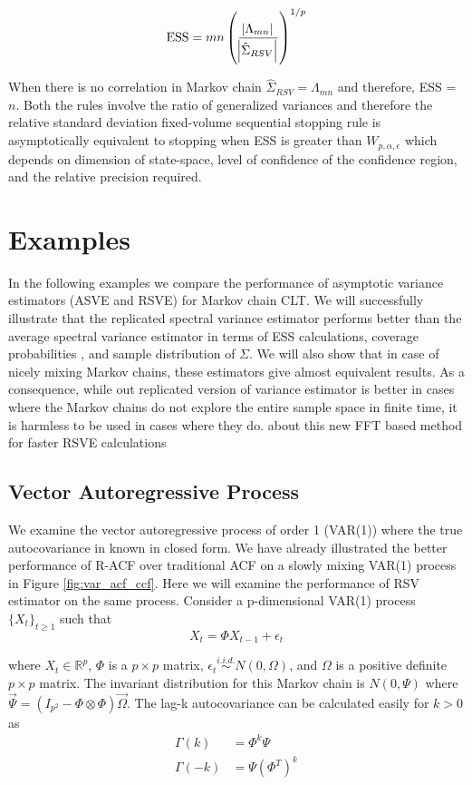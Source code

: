 \documentclass[12pt]{article}
\theoremstyle{remark}
\begin{document}
\[
\text{ESS} = mn\left(\dfrac{\abs{\Lambda_{mn}}}{\abs{\hat{\Sigma}_{RSV}}}\right)^{1/p}
\]

When there is no correlation in Markov chain $\hat{\Sigma}_{RSV} = \Lambda_{mn}$ and therefore, ESS = $n$. Both the rules involve the ratio of generalized variances and therefore the relative standard deviation fixed-volume sequential stopping rule is asymptotically equivalent to stopping when ESS is greater than $W_{p,\alpha,\epsilon}$ which depends on dimension of state-space, level of confidence of the confidence region, and the relative precision required. 

\section{Examples} \label{sec:examples}

In the following examples we compare the performance of asymptotic variance estimators (ASVE and RSVE) for Markov chain CLT. We will successfully illustrate that the replicated spectral variance estimator performs better than the average spectral variance estimator in terms of ESS calculations, coverage probabilities , and sample distribution of $\Sigma$. We will also show that in case of nicely mixing Markov chains, these estimators give almost equivalent results. As a consequence, while out replicated version of variance estimator is better in cases where the Markov chains do not explore the entire sample space in finite time, it is harmless to be used in cases where they do.  
{\color{red}about this new FFT based method for faster RSVE calculations}

\subsection{Vector Autoregressive Process} \label{ex:var}

We examine the vector autoregressive process of order 1 (VAR(1)) where the true autocovariance in known in closed form. We have already illustrated the better performance of R-ACF over traditional ACF on a slowly mixing VAR(1) process in Figure \ref{fig:var_acf_ccf}. Here we will examine the performance of RSV estimator on the same process. Consider a p-dimensional VAR(1) process $\{X_t\}_{t \geq 1}$ such that
%
\[
X_t = \Phi X_{t-1} + \epsilon_t
\]

where $X_t \in \mathbb{R}^p$, $\Phi $ is a $p \times p $ matrix, $ \epsilon_t \overset{i.i.d.}{\sim} N(0, \Omega)$, and $\Omega$ is a positive definite $p \times p$ matrix. The invariant distribution for this Markov chain is $N(0, \Psi)$ where $\Vec{\Psi} = (I_{p^2} - \Phi \otimes \Phi)\Vec{\Omega}$. The lag-k autocovariance can be calculated easily for $k >0$ as
%
\begin{align*}
    \Gamma(k) &= \Phi^k\Psi\\
    \Gamma(-k) &= \Psi(\Phi^T)^k
\end{align*}
\end{document}
